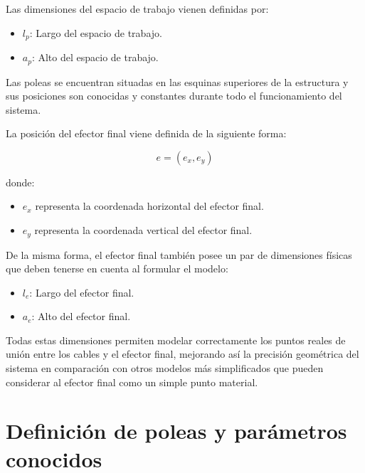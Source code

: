 \vspace{0.25cm}

Las dimensiones del espacio de trabajo vienen definidas por:

\begin{itemize}
\item $l_p$: Largo del espacio de trabajo.
\item $a_p$: Alto del espacio de trabajo.
\end{itemize}

Las poleas se encuentran situadas en las esquinas superiores de la estructura y sus posiciones son conocidas y constantes durante todo el funcionamiento del sistema.

\newpage

La posición del efector final viene definida de la siguiente forma:

\begin{myequation}[h]
\begin{equation}
e = (e_x, e_y)
\end{equation}
\caption[Posición del efector final en el espacio de trabajo.]{Posición del efector final en el espacio de trabajo.}
\end{myequation}

donde:

\begin{itemize}
\item $e_x$ representa la coordenada horizontal del efector final.
\item $e_y$ representa la coordenada vertical del efector final.
\end{itemize}

De la misma forma, el efector final también posee un par de dimensiones físicas que deben tenerse en cuenta al formular el modelo:

\begin{itemize}
\item $l_e$: Largo del efector final.
\item $a_e$: Alto del efector final.
\end{itemize}

Todas estas dimensiones permiten modelar correctamente los puntos reales de unión entre los cables y el efector final, mejorando así la precisión geométrica del sistema en comparación con otros modelos más simplificados que pueden considerar al efector final como un simple punto material.

\section{Definición de poleas y parámetros conocidos}
\label{sec:segundaseccion}

